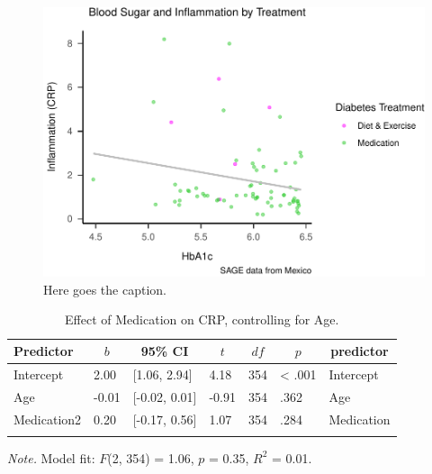 \documentclass[
  man]{apa6}
\begin{document}
\begin{figure}
\centering
\includegraphics{NEW_Final_Groupof5_files/figure-latex/tian-filtering-1.pdf}
\caption{\label{fig:tian-filtering}Here goes the caption.}
\end{figure}



\begin{table}[tbp]

\begin{center}
\begin{threeparttable}

\caption{\label{tab:regtab1}Effect of Medication on CRP, controlling for Age. }

\begin{tabular}{lllllll}
\toprule
Predictor & \multicolumn{1}{c}{$b$} & \multicolumn{1}{c}{95\% CI} & \multicolumn{1}{c}{$t$} & \multicolumn{1}{c}{$\mathit{df}$} & \multicolumn{1}{c}{$p$} & \multicolumn{1}{c}{predictor}\\
\midrule
Intercept & 2.00 & {}[1.06, 2.94] & 4.18 & 354 & < .001 & Intercept\\
Age & -0.01 & {}[-0.02, 0.01] & -0.91 & 354 & .362 & Age\\
Medication2 & 0.20 & {}[-0.17, 0.56] & 1.07 & 354 & .284 & Medication\\
\bottomrule
\addlinespace
\end{tabular}

\begin{tablenotes}[para]
\normalsize{\textit{Note.} Model fit: $F$(2, 354) = 1.06, $p$ = 0.35, $R^2$ = 0.01.}
\end{tablenotes}

\end{threeparttable}
\end{center}

\end{table}
\end{document}
